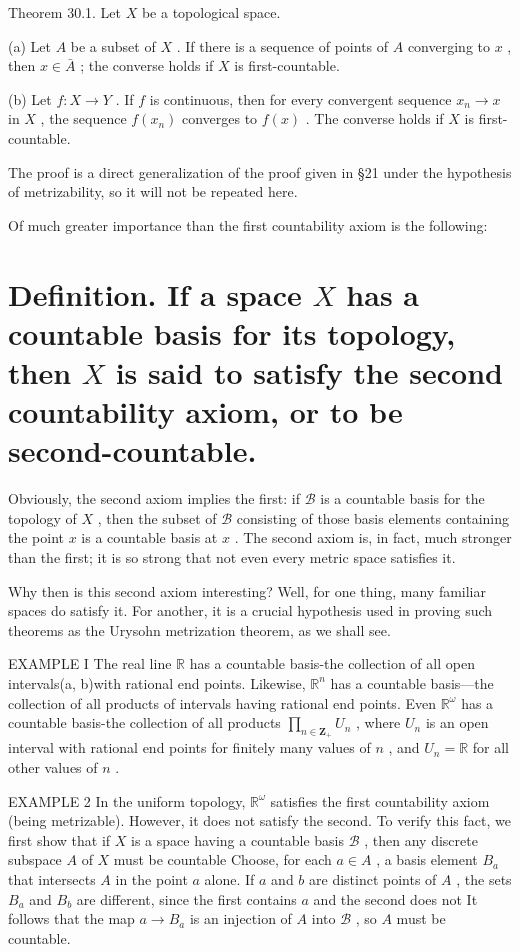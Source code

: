 Theorem 30.1. Let \(X\) be a topological space.

(a) Let \(A\) be a subset of \(X\) . If there is a sequence of points of \(A\) converging to \(x\) , then \(x \in  \bar{A}\) ; the converse holds if \(X\) is first-countable.

(b) Let \(f : X \rightarrow  Y\) . If \(f\) is continuous, then for every convergent sequence \({x}_{n} \rightarrow  x\) in \(X\) , the sequence \(f\left( {x}_{n}\right)\) converges to \(f\left( x\right)\) . The converse holds if \(X\) is first-countable.

The proof is a direct generalization of the proof given in §21 under the hypothesis of metrizability, so it will not be repeated here.

Of much greater importance than the first countability axiom is the following:

\section*{Definition. If a space \(X\) has a countable basis for its topology, then \(X\) is said to satisfy the second countability axiom, or to be second-countable.}

Obviously, the second axiom implies the first: if \(\mathcal{B}\) is a countable basis for the topology of \(X\) , then the subset of \(\mathcal{B}\) consisting of those basis elements containing the point \(x\) is a countable basis at \(x\) . The second axiom is, in fact, much stronger than the first; it is so strong that not even every metric space satisfies it.

Why then is this second axiom interesting? Well, for one thing, many familiar spaces do satisfy it. For another, it is a crucial hypothesis used in proving such theorems as the Urysohn metrization theorem, as we shall see.

EXAMPLE I The real line \(\mathbb{R}\) has a countable basis-the collection of all open intervals(a, b)with rational end points. Likewise, \({\mathbb{R}}^{n}\) has a countable basis—the collection of all products of intervals having rational end points. Even \({\mathbb{R}}^{\omega }\) has a countable basis-the collection of all products \(\mathop{\prod }\limits_{{n \in  {\mathbf{Z}}_{ + }}}{U}_{n}\) , where \({U}_{n}\) is an open interval with rational end points for finitely many values of \(n\) , and \({U}_{n} = \mathbb{R}\) for all other values of \(n\) .

EXAMPLE 2 In the uniform topology, \({\mathbb{R}}^{\omega }\) satisfies the first countability axiom (being metrizable). However, it does not satisfy the second. To verify this fact, we first show that if \(X\) is a space having a countable basis \(\mathcal{B}\) , then any discrete subspace \(A\) of \(X\) must be countable Choose, for each \(a \in  A\) , a basis element \({B}_{a}\) that intersects \(A\) in the point \(a\) alone. If \(a\) and \(b\) are distinct points of \(A\) , the sets \({B}_{a}\) and \({B}_{b}\) are different, since the first contains \(a\) and the second does not It follows that the map \(a \rightarrow  {B}_{a}\) is an injection of \(A\) into \(\mathcal{B}\) , so \(A\) must be countable.

